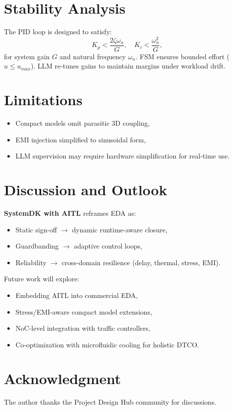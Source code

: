 \documentclass[conference]{IEEEtran}
\begin{document}
\section{Stability Analysis}
The PID loop is designed to satisfy:
\begin{equation}
K_p < \frac{2\zeta\omega_n}{G}, \quad K_i < \frac{\omega_n^2}{G},
\end{equation}
for system gain $G$ and natural frequency $\omega_n$.  
FSM ensures bounded effort ($u \leq u_{max}$).  
LLM re-tunes gains to maintain margins under workload drift.

\section{Limitations}
\begin{itemize}
  \item Compact models omit parasitic 3D coupling,
  \item EMI injection simplified to sinusoidal form,
  \item LLM supervision may require hardware simplification for real-time use.
\end{itemize}

\section{Discussion and Outlook}
\textbf{SystemDK with AITL} reframes EDA as:
\begin{itemize}
  \item Static sign-off $\to$ dynamic runtime-aware closure,
  \item Guardbanding $\to$ adaptive control loops,
  \item Reliability $\to$ cross-domain resilience (delay, thermal, stress, EMI).
\end{itemize}

Future work will explore:
\begin{itemize}
  \item Embedding AITL into commercial EDA,
  \item Stress/EMI-aware compact model extensions,
  \item NoC-level integration with traffic controllers,
  \item Co-optimization with microfluidic cooling for holistic DTCO.
\end{itemize}

\section*{Acknowledgment}
The author thanks the Project Design Hub community for discussions.
\end{document}
